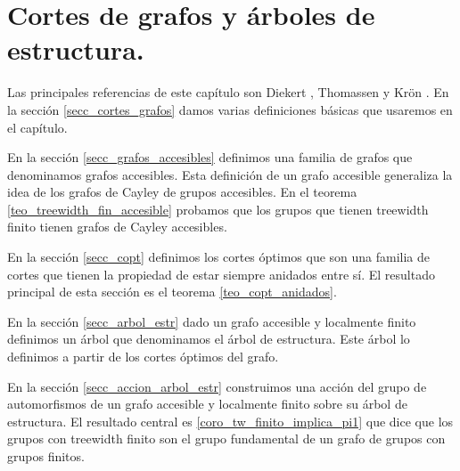 \documentclass[tesis.tex]{subfiles}
\begin{document}
	
\chapter{Cortes de grafos y árboles de estructura.}

Las principales referencias de este capítulo son Diekert \cite{diekert2013context}, Thomassen \cite{thomassen1993vertex} y Krön \cite{kron2010cutting}.
En la sección \ref{secc_cortes_grafos} damos varias definiciones básicas que usaremos en el capítulo. 

En la sección \ref{secc_grafos_accesibles} definimos una familia de grafos que denominamos grafos accesibles.
Esta definición de un grafo accesible generaliza la idea de los grafos de Cayley de grupos accesibles.
En el teorema \ref{teo_treewidth_fin_accesible} probamos que los grupos que tienen treewidth finito tienen grafos de Cayley accesibles. 

En la sección \ref{secc_copt} definimos los cortes óptimos que son una familia de cortes que tienen la propiedad de estar siempre anidados entre sí.
El resultado principal de esta sección es el teorema \ref{teo_copt_anidados}.

En la sección \ref{secc_arbol_estr} dado un grafo accesible y localmente finito definimos un árbol que denominamos el árbol de estructura.
Este árbol lo definimos a partir de los cortes óptimos del grafo.

En la sección \ref{secc_accion_arbol_estr} construimos una acción del grupo de automorfismos de un grafo accesible y localmente finito sobre su árbol de estructura.
El resultado central es \ref{coro_tw_finito_implica_pi1} que dice que los grupos con treewidth finito son el grupo fundamental de un grafo de grupos con grupos finitos.



%
\end{document}
